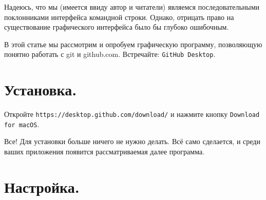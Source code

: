 \documentclass[12pt,a4paper]{article}
\begin{document}
Надеюсь, что мы (имеется ввиду автор и читатели) являемся последовательными поклонниками
интерфейса командной строки. Однако, отрицать право на существование графического интерфейса было бы
глубоко ошибочным.

В этой статье мы рассмотрим и опробуем графическую программу, позволяющую понятно работать
с git и github.com. Встречайте: \texttt{GitHub Desktop}.

\section{Установка.}
Откройте \texttt{https://desktop.github.com/download/} и нажмите кнопку \texttt{Download for macOS}.

Все! Для установки больше ничего не нужно делать. Всё само сделается, и среди ваших приложения
появится рассматриваемая далее программа.
\section{Настройка.}
\end{document}
